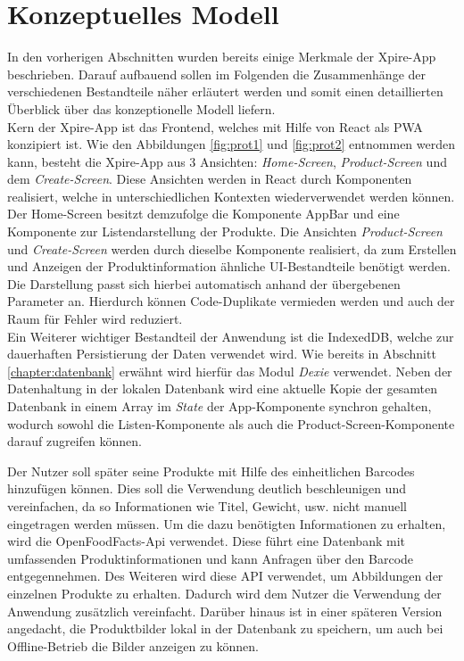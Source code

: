 \newpage
\section{Konzeptuelles Modell}

In den vorherigen Abschnitten wurden bereits einige Merkmale der Xpire-App beschrieben. Darauf aufbauend sollen im Folgenden die Zusammenhänge der verschiedenen Bestandteile näher erläutert werden und somit einen detaillierten Überblick über das konzeptionelle Modell liefern.\\
Kern der Xpire-App ist das Frontend, welches mit Hilfe von React als PWA konzipiert ist. Wie den Abbildungen \ref{fig:prot1} und \ref{fig:prot2} entnommen werden kann, besteht die Xpire-App aus 3 Ansichten: \textit{Home-Screen}, \textit{Product-Screen} und dem \textit{Create-Screen}. Diese Ansichten werden in React durch Komponenten realisiert, welche in unterschiedlichen Kontexten wiederverwendet werden können. Der Home-Screen besitzt demzufolge die Komponente AppBar und eine Komponente zur Listendarstellung der Produkte. Die Ansichten \textit{Product-Screen} und \textit{Create-Screen} werden durch dieselbe Komponente realisiert, da zum Erstellen und Anzeigen der Produktinformation ähnliche UI-Bestandteile benötigt werden. Die Darstellung passt sich hierbei automatisch anhand der übergebenen Parameter an. Hierdurch können Code-Duplikate vermieden werden und auch der Raum für Fehler wird reduziert.\\
Ein Weiterer wichtiger Bestandteil der Anwendung ist die IndexedDB, welche zur dauerhaften Persistierung der Daten verwendet wird. Wie bereits in Abschnitt \ref{chapter:datenbank} erwähnt wird hierfür das Modul \textit{Dexie} verwendet. Neben der Datenhaltung in der lokalen Datenbank wird eine aktuelle Kopie der gesamten Datenbank in einem Array im \textit{State} der App-Komponente synchron gehalten, wodurch sowohl die Listen-Komponente als auch die Product-Screen-Komponente darauf zugreifen können.

Der Nutzer soll später seine Produkte mit Hilfe des einheitlichen Barcodes hinzufügen können. Dies soll die Verwendung deutlich beschleunigen und vereinfachen, da so Informationen wie Titel, Gewicht, usw. nicht manuell eingetragen werden müssen. Um die dazu benötigten Informationen zu erhalten, wird die OpenFoodFacts-Api verwendet. Diese führt eine Datenbank mit umfassenden Produktinformationen und kann Anfragen über den Barcode entgegennehmen. Des Weiteren wird diese API verwendet, um Abbildungen der einzelnen Produkte zu erhalten. Dadurch wird dem Nutzer die Verwendung der Anwendung zusätzlich vereinfacht. Darüber hinaus ist in einer späteren Version angedacht, die Produktbilder lokal in der Datenbank zu speichern, um auch bei Offline-Betrieb die Bilder anzeigen zu können.

